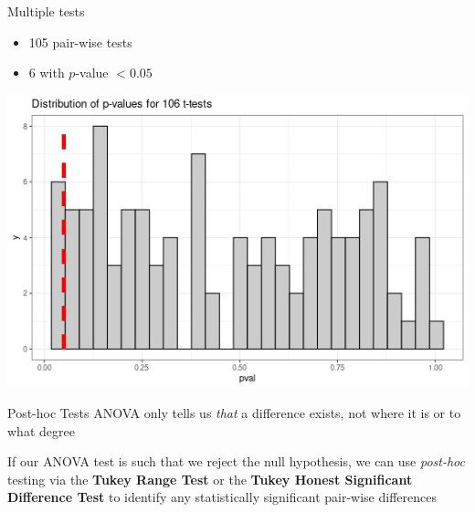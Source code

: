 \documentclass{beamer}
\begin{document}
\begin{frame}{Multiple tests}
\begin{itemize}
\item 105 pair-wise tests
\item 6 with $p$-value $< 0.05$
\end{itemize}
\begin{center}
\includegraphics[scale=0.5]{pval_hist.png}
\end{center}
\end{frame}

\begin{frame}{Post-hoc Tests}
ANOVA only tells us \textit{that} a difference exists, not where it is or to what degree \vspace{8mm}

If our ANOVA test is such that we reject the null hypothesis, we can use \textit{post-hoc} testing via the \textbf{Tukey Range Test} or the \textbf{Tukey Honest Significant Difference Test} to identify any statistically significant pair-wise differences
\end{frame}
\end{document}
